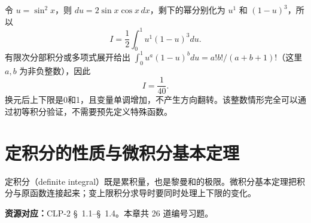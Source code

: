 \documentclass[12pt,fontset=fandol]{ctexart}
\begin{document}
\begin{solve}\label{ans:c16q24}
令 $u=\sin^2x$，则 $du=2\sin x\cos x\,dx$，剩下的幂分别化为 $u^{1}$ 和 $(1-u)^{3}$，所以
\[
I=\frac12\int_0^1u^{1}(1-u)^{3}du.
\]
有限次分部积分或多项式展开给出 $\int_0^1u^a(1-u)^bdu=a!b!/(a+b+1)!$（这里 $a,b$ 为非负整数），因此
\[
I=\frac{1}{40}.
\]
换元后上下限是0和1，且变量单调增加，不产生方向翻转。该整数情形完全可以通过初等积分验证，不需要预先定义特殊函数。
\end{solve}

\clearpage
\section{定积分的性质与微积分基本定理}\label{sec:ch17}
定积分（definite integral）既是累积量，也是黎曼和的极限。微积分基本定理把积分与原函数连接起来；变上限积分求导时要同时处理上下限的变化。

\textbf{资源对应：}CLP-2 \S~1.1--\S~1.4。本章共 26 道编号习题。
\end{document}
